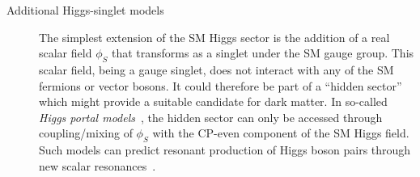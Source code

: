 \begin{description}

\item[Additional Higgs-singlet models] The simplest extension of the SM Higgs
  sector is the addition of a real scalar field $\phi_{S}$ that transforms as a
  singlet under the SM gauge group. This scalar field, being a gauge singlet,
  does not interact with any of the SM fermions or vector bosons. It could
  therefore be part of a ``hidden sector'' which might provide a suitable
  candidate for dark matter. In so-called \emph{Higgs portal
    models}~\cite{Patt:2006fw}, the hidden sector can only be accessed through
  coupling/mixing of $\phi_{S}$ with the CP-even component of the SM Higgs
  field. Such models can predict resonant production of Higgs boson pairs
  through new scalar
  resonances~\cite{Schabinger:2005ei,Bowen:2007ia,Barger:2007im,Dolan:2012ac,No:2013wsa,Chen:2014ask,Robens:2016xkb,DiMicco:2019ngk}.


\end{description}
